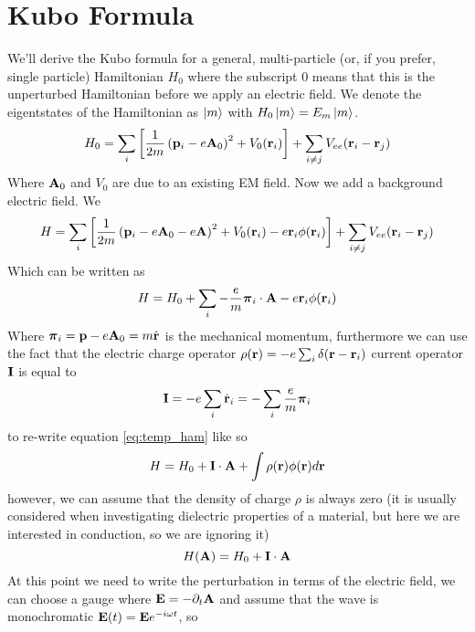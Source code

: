 \section{Kubo Formula}
We'll derive the Kubo formula for a general, multi-particle (or, if you prefer, single particle) Hamiltonian $H_0$ where the subscript 0 means that this is the unperturbed Hamiltonian before we apply an electric field. We denote the eigentstates of the Hamiltonian as $\ket m$ with $H_0\ket m=E_m \ket m$.
\begin{equation}
    H_0=\sum_i\left[\frac{1}{2m}\left(\mathbf{p}_i-e\mathbf{A}_0\right)^2 + V_0(\mathbf{r}_i)\right]+\sum_{i\neq j}V_{ee}(\mathbf{r}_i-\mathbf{r}_j)
\end{equation}
Where $\mathbf{A}_0$ and $V_0$ are due to an existing EM field. Now we add a background electric field. We 
\begin{equation}
    H=\sum_i\left[\frac{1}{2m}\left(\mathbf{p}_i-e\mathbf{A}_0 - e\mathbf{A}\right)^2 + V_0(\mathbf{r}_i) - e\mathbf{r}_i\phi(\mathbf{r}_i)\right]+\sum_{i\neq j}V_{ee}(\mathbf{r}_i-\mathbf{r}_j)
\end{equation}
Which can be written as 
\begin{equation}
    H=H_0 + \sum_{i}-\frac{e}m \boldsymbol \pi_i\cdot \mathbf{A} - e\mathbf{r}_i\phi(\mathbf{r}_i)
    \label{eq:temp_ham}
\end{equation}
Where $\boldsymbol \pi_i=\mathbf{p} -e\mathbf{A}_0=m\dot{\mathbf{r}}$ is the mechanical momentum,
furthermore we can use the fact that the electric charge operator $\rho(\mathbf{r})=-e\sum_{i}\delta(\mathbf{r}-\mathbf{r}_i)$ current operator  $\mathbf{I}$ is equal to 
\begin{equation}
    \mathbf{I}=-e\sum_{i}\dot{\mathbf{r}}_i=-\sum_{i}\frac{e}m \boldsymbol \pi_i
\end{equation}
to re-write equation \ref{eq:temp_ham} like so
\begin{equation}
    H=H_0+\mathbf{I}\cdot \mathbf{A} + \int\rho(\mathbf{r})\phi(\mathbf{r})d\mathbf{r}
\end{equation}
however, we can assume that the density of charge $\rho$ is always zero (it is usually considered when investigating dielectric properties of a material, but here we are interested in conduction, so we are ignoring it)
\begin{equation}
    H(\mathbf{A})=H_0+\mathbf{I}\cdot \mathbf{A}
    \label{eq:deltaH}
\end{equation}
At this point we need to write the perturbation in terms of the electric field, we can choose a gauge where $\mathbf{E}=-\partial_t\mathbf{A}$ and assume that the wave is monochromatic $\mathbf{E}(t)=\mathbf{E}e^{-i\omega t}$, so 
